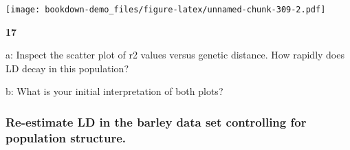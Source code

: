 \documentclass[
]{book}
\makeatletter
\newenvironment{kframe}{%
\medskip{}
\setlength{\fboxsep}{.8em}
 \def\at@end@of@kframe{}%
 \ifinner\ifhmode%
  \def\at@end@of@kframe{\end{minipage}}%
  \begin{minipage}{\columnwidth}%
 \fi\fi%
 \def\FrameCommand##1{\hskip\@totalleftmargin \hskip-\fboxsep
 \colorbox{shadecolor}{##1}\hskip-\fboxsep
     \hskip-\linewidth \hskip-\@totalleftmargin \hskip\columnwidth}%
 \MakeFramed {\advance\hsize-\width
   \@totalleftmargin\z@ \linewidth\hsize
   \@setminipage}}%
 {\par\unskip\endMakeFramed%
 \at@end@of@kframe}
\newenvironment{rmdblock}[1]
  {
  \begin{itemize}
  \renewcommand{\labelitemi}{
    \raisebox{-.7\height}[0pt][0pt]{
      {\setkeys{Gin}{width=3em,keepaspectratio}\texttt{[image: images/\#1]}}
    }
  }
  \setlength{\fboxsep}{1em}
  \begin{kframe}
  \item
  }
  {
  \end{kframe}
  \end{itemize}
  }
\newenvironment{rmdquiz}
  {\begin{rmdblock}{quiz}}
  {\end{rmdblock}}
\makeatother
\begin{document}
\texttt{[image: bookdown-demo\_files/figure-latex/unnamed-chunk-309-2.pdf]}

\begin{rmdquiz}
\textbf{17}

a: Inspect the scatter plot of r2 values versus genetic distance. How rapidly does LD decay in this population?

b: What is your initial interpretation of both plots?
\end{rmdquiz}

\hypertarget{re-estimate-ld-in-the-barley-data-set-controlling-for-population-structure.}{%
\subsubsection{Re-estimate LD in the barley data set controlling for population structure.}\label{re-estimate-ld-in-the-barley-data-set-controlling-for-population-structure.}}
\end{document}
